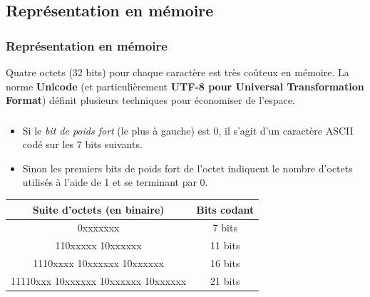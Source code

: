 \documentclass[svgnames,11pt]{beamer}
\begin{document}
\subsection{Représentation en mémoire}
\begin{frame}
    \frametitle{Représentation en mémoire}

\begin{aretenir}[]
    Quatre octets (32 bits) pour chaque caractère est très coûteux en mémoire. La norme \textbf{Unicode} (et particulièrement \textbf{UTF-8 pour Universal Transformation Format}) définit plusieurs techniques pour économiser de l’espace.
\end{aretenir}

\end{frame}
\begin{frame}
    \frametitle{}

    \begin{itemize}
        \item Si le \emph{bit de poids fort} (le plus à gauche) est 0, il s'agit d'un caractère ASCII codé sur les 7 bits suivants.
        \item Sinon les premiers bits de poids fort de l'octet indiquent le nombre d'octets utilisés à l'aide de 1 et se terminant par 0.
        \end{itemize}

        \begin{center}
            \begin{tabular}{|c|c|}
            \hline 
            Suite d'octets (en binaire) & Bits codant \\ 
            \hline 
            0xxxxxxx & 7 bits \\ 
            \hline 
            110xxxxx 10xxxxxx & 11 bits \\ 
            \hline 
            1110xxxx 10xxxxxx 10xxxxxx & 16 bits \\ 
            \hline 
            11110xxx 10xxxxxx 10xxxxxx 10xxxxxx & 21 bits \\ 
            \hline 
            \end{tabular}
            \end{center}
\end{frame}
\end{document}
